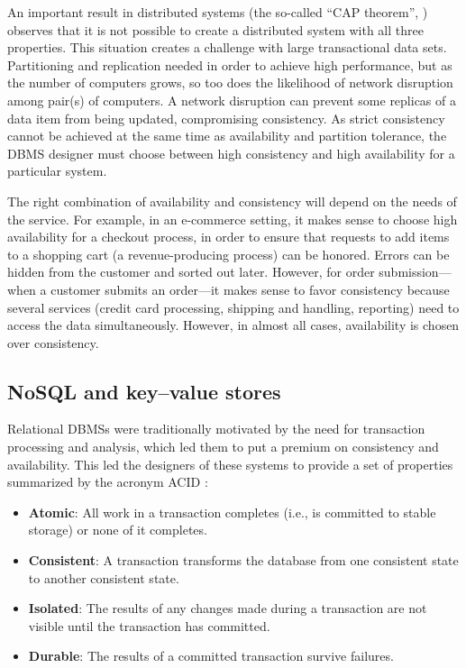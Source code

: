 \documentclass[]{krantz}
\begin{document}
An important result in distributed systems (the so-called ``CAP
theorem'', \citet{brewer2012cap}) observes that it is not possible to
create a distributed system with all three properties. This situation
creates a challenge with large transactional data sets. Partitioning and
replication needed in order to achieve high performance, but as the
number of computers grows, so too does the likelihood of network
disruption among pair(s) of computers. A network disruption can prevent
some replicas of a data item from being updated, compromising
consistency. As strict consistency cannot be achieved at the same time
as availability and partition tolerance, the DBMS designer must choose
between high consistency and high availability for a particular system.

The right combination of availability and consistency will depend on the
needs of the service. For example, in an e-commerce setting, it makes
sense to choose high availability for a checkout process, in order to
ensure that requests to add items to a shopping cart (a
revenue-producing process) can be honored. Errors can be hidden from the
customer and sorted out later. However, for order submission---when a
customer submits an order---it makes sense to favor consistency because
several services (credit card processing, shipping and handling,
reporting) need to access the data simultaneously. However, in almost
all cases, availability is chosen over consistency.

\subsection{NoSQL and key--value
stores}\label{nosql-and-keyvalue-stores}

Relational DBMSs were traditionally motivated by the need for
transaction processing and analysis, which led them to put a premium on
consistency and availability. This led the designers of these systems to
provide a set of properties summarized by the acronym ACID
\citep{gray1981transaction, silberschatz2010database}:

\begin{itemize}
\item
  \textbf{Atomic}: All work in a transaction completes (i.e., is
  committed to stable storage) or none of it completes.
\item
  \textbf{Consistent}: A transaction transforms the database from one
  consistent state to another consistent state.
\item
  \textbf{Isolated}: The results of any changes made during a
  transaction are not visible until the transaction has committed.
\item
  \textbf{Durable}: The results of a committed transaction survive
  failures.
\end{itemize}
\end{document}
